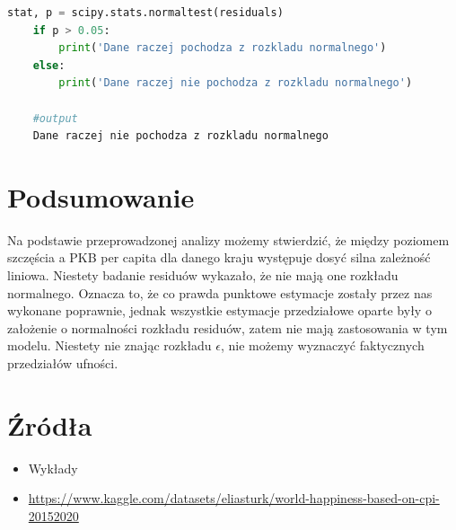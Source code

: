 \documentclass{article}
\theoremstyle{break}
\begin{document}
\begin{lstlisting}[language=Python, caption=Test Levene'a, label={norm}]
	stat, p = scipy.stats.normaltest(residuals)
	if p > 0.05:
		print('Dane raczej pochodza z rozkladu normalnego')
	else:
		print('Dane raczej nie pochodza z rozkladu normalnego')
		
	#output
	Dane raczej nie pochodza z rozkladu normalnego
\end{lstlisting}

	
\section{Podsumowanie}

Na podstawie przeprowadzonej analizy możemy stwierdzić, że między poziomem szczęścia a PKB per capita dla danego kraju występuje dosyć silna zależność liniowa. Niestety badanie residuów wykazało, że nie mają one rozkładu normalnego. Oznacza to, że co prawda punktowe estymacje zostały przez nas wykonane poprawnie, jednak wszystkie estymacje przedziałowe oparte były o założenie o normalności rozkładu residuów, zatem nie mają zastosowania w tym modelu. Niestety nie znając rozkładu $\epsilon$, nie możemy wyznaczyć faktycznych przedziałów ufności.
	
	\section{Źródła}
	\begin{itemize}
		\item Wykłady
		\item \url{https://www.kaggle.com/datasets/eliasturk/world-happiness-based-on-cpi-20152020}
	\end{itemize}
	
	
\end{document}

